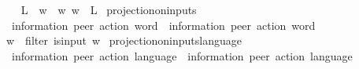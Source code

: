 \begin{isabellebody}
\ \ \isanewline
\ \ {\isachardoublequoteopen}L{\isasymdownharpoonright}\isactrlsub {\isacharbang}{\kern0pt}\ {\isasymequiv}\ {\isacharbraceleft}{\kern0pt}w{\isasymdown}\isactrlsub {\isacharbang}{\kern0pt}\ {\isacharbar}{\kern0pt}\ w{\isachardot}{\kern0pt}\ w\ {\isasymin}\ L{\isacharbraceright}{\kern0pt}{\isachardoublequoteclose}\isanewline
\isanewline
{}\isamarkupfalse%
\ projection{\isacharunderscore}{\kern0pt}on{\isacharunderscore}{\kern0pt}inputs\isanewline
\ \ {\isacharcolon}{\kern0pt}{\isacharcolon}{\kern0pt}\ {\isachardoublequoteopen}{\isacharparenleft}{\kern0pt}{\isacharprime}{\kern0pt}information{\isacharcomma}{\kern0pt}\ {\isacharprime}{\kern0pt}peer{\isacharparenright}{\kern0pt}\ action\ word\ {\isasymRightarrow}\ {\isacharparenleft}{\kern0pt}{\isacharprime}{\kern0pt}information{\isacharcomma}{\kern0pt}\ {\isacharprime}{\kern0pt}peer{\isacharparenright}{\kern0pt}\ action\ word{\isachardoublequoteclose}\ \ {\isacharparenleft}{\kern0pt}{\isachardoublequoteopen}{\isacharunderscore}{\kern0pt}{\isasymdown}\isactrlsub {\isacharquery}{\kern0pt}{\isachardoublequoteclose}\ {\isacharbrackleft}{\kern0pt}{}{}{\isacharbrackright}{\kern0pt}\ {}{}{}{\isacharparenright}{\kern0pt}\isanewline
\ \ \isanewline
\ \ {\isachardoublequoteopen}w{\isasymdown}\isactrlsub {\isacharquery}{\kern0pt}\ {\isasymequiv}\ filter\ is{\isacharunderscore}{\kern0pt}input\ w{\isachardoublequoteclose}\isanewline
\isanewline
{}\isamarkupfalse%
\ projection{\isacharunderscore}{\kern0pt}on{\isacharunderscore}{\kern0pt}inputs{\isacharunderscore}{\kern0pt}language\isanewline
\ \ {\isacharcolon}{\kern0pt}{\isacharcolon}{\kern0pt}\ {\isachardoublequoteopen}{\isacharparenleft}{\kern0pt}{\isacharprime}{\kern0pt}information{\isacharcomma}{\kern0pt}\ {\isacharprime}{\kern0pt}peer{\isacharparenright}{\kern0pt}\ action\ language\ {\isasymRightarrow}\ {\isacharparenleft}{\kern0pt}{\isacharprime}{\kern0pt}information{\isacharcomma}{\kern0pt}\ {\isacharprime}{\kern0pt}peer{\isacharparenright}{\kern0pt}\ action\ language{\isachardoublequoteclose}\isanewline
\ \ \ \ \ {\isacharparenleft}{\kern0pt}{\isachardoublequoteopen}{\isacharunderscore}{\kern0pt}{\isasymdownharpoonright}\isactrlsub {\isacharquery}{\kern0pt}{\isachardoublequoteclose}\ {\isacharbrackleft}{\kern0pt}{}{}{}{\isacharbrackright}{\kern0pt}\ {}{}{}{\isacharparenright}{\kern0pt}\isanewline
\ \ \isanewline

\end{isabellebody}
